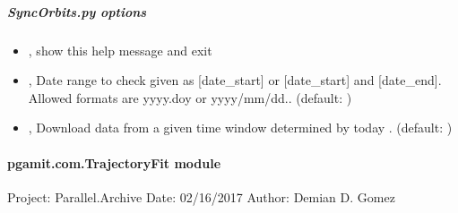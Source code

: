 \documentclass[letterpaper,10pt,english]{sphinxmanual}
\begin{document}
\subparagraph{SyncOrbits.py options}
\label{\detokenize{pgamit.com:SyncOrbits.py-options}}\begin{itemize}
\item {} 
\sphinxAtStartPar
{\hyperref[\detokenize{pgamit.com:SyncOrbits.py--h}]{}}, {\hyperref[\detokenize{pgamit.com:SyncOrbits.py---help}]{}} \sphinxhyphen{} show this help message and exit

\item {} 
\sphinxAtStartPar
{\hyperref[\detokenize{pgamit.com:SyncOrbits.py--date}]{}} , {\hyperref[\detokenize{pgamit.com:SyncOrbits.py---date_range}]{}}  \sphinxhyphen{} Date range to check given as {[}date\_start{]} or {[}date\_start{]} and {[}date\_end{]}. Allowed formats are yyyy.doy or yyyy/mm/dd.. (default: )

\item {} 
\sphinxAtStartPar
{\hyperref[\detokenize{pgamit.com:SyncOrbits.py--win}]{}} , {\hyperref[\detokenize{pgamit.com:SyncOrbits.py---window}]{}}  \sphinxhyphen{} Download data from a given time window determined by today \sphinxhyphen{} . (default: )

\end{itemize}


\paragraph{pgamit.com.TrajectoryFit module}
\label{\detokenize{pgamit.com:module-pgamit.com.TrajectoryFit}}\label{\detokenize{pgamit.com:pgamit-com-trajectoryfit-module}}
\sphinxAtStartPar
Project: Parallel.Archive
Date: 02/16/2017
Author: Demian D. Gomez
\end{document}
